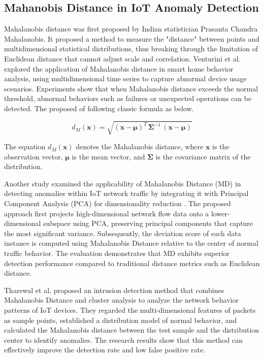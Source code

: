 \begin{ZhChapter}
    \section{Mahanobis Distance in IoT Anomaly Detection}
    Mahalanobis distance was first proposed by Indian statistician Prasanta Chandra Mahalanobis. It proposed a method to measure the "distance" between points and multidimensional statistical distributions, thus breaking through the limitation of Euclidean distance that cannot adjust scale and correlation.
    Venturini et al. \cite{venturini2024smarthomes} explored the application of Mahalanobis distance in smart home behavior analysis, using multidimensional time series to capture abnormal device usage scenarios. Experiments show that when Mahalanobis distance exceeds the normal threshold, abnormal behaviors such as failures or unexpected operations can be detected. The proposed of following classic formula as below.


    \begin{equation}
        d_M(\mathbf{x}) = \sqrt{(\mathbf{x} - \boldsymbol{\mu})^T \, \boldsymbol{\Sigma}^{-1} \, (\mathbf{x} - \boldsymbol{\mu})}
    \end{equation}

    The equation $d_M(\mathbf{x})$ denotes the Mahalanobis distance, where $\mathbf{x}$ is the observation vector, $\boldsymbol{\mu}$ is the mean vector, and $\boldsymbol{\Sigma}$ is the covariance matrix of the distribution.




    Another study examined the applicability of Mahalanobis Distance (MD) in detecting anomalies within IoT network traffic by integrating it with Principal Component Analysis (PCA) for dimensionality reduction \cite{icact2018md}. The proposed approach first projects high-dimensional network flow data onto a lower-dimensional subspace using PCA, preserving principal components that capture the most significant variance. Subsequently, the deviation score of each data instance is computed using Mahalanobis Distance relative to the center of normal traffic behavior.
    The evaluation demonstrates that MD exhibits superior detection performance compared to traditional distance metrics such as Euclidean distance. %

    Tharewal et al. \cite{tharewal2022intrusion} proposed an intrusion detection method that combines Mahalanobis Distance and cluster analysis to analyze the network behavior patterns of IoT devices. They regarded the multi-dimensional features of packets as sample points, established a distribution model of normal behavior, and calculated the Mahalanobis distance between the test sample and the distribution center to identify anomalies. The research results show that this method can effectively improve the detection rate and low false positive rate.


\end{ZhChapter}
